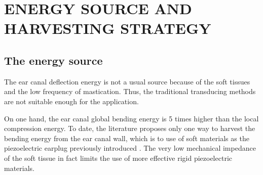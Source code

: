 \documentclass[3p,twocolumn,preprint]{elsarticle}
\begin{document}
\section{ENERGY SOURCE AND HARVESTING STRATEGY}
\label{sec:THE ENERGY SOURCE AND HARVESTING STRATEGY}
	\subsection{The energy source}	
	\label{The energy source}
The ear canal deflection energy is not a usual source because of the soft tissues and the low frequency of mastication. Thus, the traditional transducing methods are not suitable enough for the application.

On one hand, the ear canal global bending energy is 5 times higher than the local compression energy. To date, the literature proposes only one way to harvest the bending energy from the ear canal wall, which is to use of soft materials as the piezoelectric earplug previously introduced \cite{Delnavaz2013}. The very low mechanical impedance of the soft tissue in fact limits the use of more effective rigid piezoelectric materials.
\end{document}
